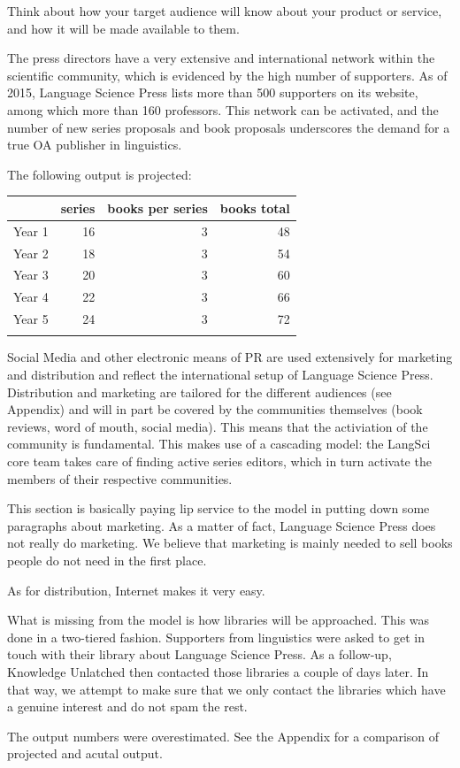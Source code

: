\documentclass[nonflat,smallfont
]{langsci/langscibook}
\newcommand{\background}[1]{ 
  \vspace{5mm}
  \renewcommand{\tblslinecolour}{lsDarkBlue}
  \tblssy[red]{explore2}{Background}{\vspace*{-5mm}#1}
}
\newcommand{\langscisolution}[1]{
  \renewcommand{\tblslinecolour}{lsLightBlue}
  \tblssy{langsci}{LangSci solution}{\vspace*{-5mm}#1}
}
\newcommand{\evaluation}[1]{
  \renewcommand{\tblslinecolour}{lsLightOrange}
  \tblssy{receipt}{Evaluation}{\vspace*{-5mm}#1}
}
\renewcommand{\tblssy}[4][black!12]{%
  \renewcommand{\langscisymbol}{#2}\renewcommand{\tblsboxcolor}{#1}
  \begin{mdframed}[style=yellowexercise,frametitle={#3}]
    #4
  \end{mdframed}
}
\begin{document}
\background{
Think about how your target audience will know about your product or service, and how it will be made available to them. 
}
\langscisolution{
The press directors have a very extensive and international network within the scientific community, which is evidenced by the high number of supporters. As of 2015, Language Science Press lists more than 500 supporters on its website, among which more than 160 professors. This network can be activated, and the number of new series proposals and book proposals underscores the demand for a true OA publisher in linguistics. 

The following output is projected:

\noindent
\begin{tabularx}{\textwidth}{Xrrr}
\lsptoprule
        & series &  books per series & books total   \\
\midrule         
Year 1 & 16      &  3                & 48              \\
Year 2 & 18      &  3                & 54              \\
Year 3 & 20      &  3                & 60              \\
Year 4 & 22      &  3                & 66              \\
Year 5 & 24      &  3                & 72              \\
\lspbottomrule
\end{tabularx}

Social Media and other electronic means of PR are used extensively for marketing and distribution and reflect the international setup of Language Science Press. Distribution and marketing are tailored for the different audiences (see Appendix) and will in part be covered by the communities themselves (book reviews, word of mouth, social media). This means that the activiation of the community is fundamental. This makes use of a cascading model: the LangSci core team takes care of finding active series editors, which in turn activate the members of their respective communities.  
}
\evaluation{
This section is basically paying lip service to the model in putting down some paragraphs about marketing. As a matter of fact, Language Science Press does not really do marketing. We believe that marketing is mainly needed to sell books people do not need in the first place. 

As for distribution, Internet makes it very easy.

What is missing from the model is how libraries will be approached. This was done in a two-tiered fashion. Supporters from linguistics were asked to get in touch with their library about Language Science Press. As a follow-up, Knowledge Unlatched then contacted those libraries a couple of days later. In that way, we attempt to make sure that we only contact the libraries which have a genuine interest and do not spam the rest.

The output numbers were overestimated. See the Appendix for a comparison of projected and acutal output. 
}
\end{document}
